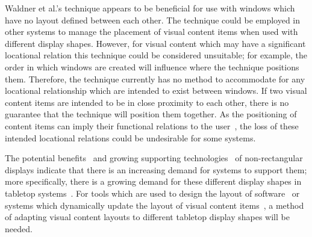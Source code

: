 \documentclass[twocolumn,compsoc]{cvm}
\begin{document}
Waldner et al.'s technique appears to be beneficial for use with windows which have no layout defined between each other.
The technique could be employed in other systems to manage the placement of visual content items when used with different display shapes.
However, for visual content which may have a significant locational relation this technique could be considered unsuitable; for example, the order in which windows are created will influence where the technique positions them.
Therefore, the technique currently has no method to accommodate for any locational relationship which are intended to exist between windows.
If two visual content items are intended to be in close proximity to each other, there is no guarantee that the technique will position them together.
As the positioning of content items can imply their functional relations to the user~\cite{Constantine1999}, the loss of these intended locational relations could be undesirable for some systems.

The potential benefits~\cite{Greenfield2006,Vernier2002} and growing supporting technologies~\cite{Boyd2007,Finney2009} of non-rectangular displays indicate that there is an increasing demand for systems to support them; more specifically, there is a growing demand for these different display shapes in tabletop systems~\cite{Hansen2009,Shen2004}.
For tools which are used to design the layout of software~\cite{Meskens2008} or systems which dynamically update the layout of visual content items~\cite{Gajos2004}, a method of adapting visual content layouts to different tabletop display shapes will be needed.





\end{document}
